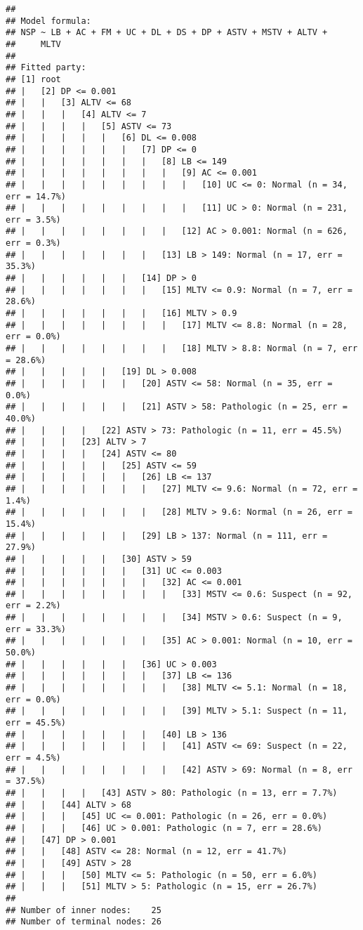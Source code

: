 \documentclass[
]{article}
\begin{document}
\begin{verbatim}
## 
## Model formula:
## NSP ~ LB + AC + FM + UC + DL + DS + DP + ASTV + MSTV + ALTV + 
##     MLTV
## 
## Fitted party:
## [1] root
## |   [2] DP <= 0.001
## |   |   [3] ALTV <= 68
## |   |   |   [4] ALTV <= 7
## |   |   |   |   [5] ASTV <= 73
## |   |   |   |   |   [6] DL <= 0.008
## |   |   |   |   |   |   [7] DP <= 0
## |   |   |   |   |   |   |   [8] LB <= 149
## |   |   |   |   |   |   |   |   [9] AC <= 0.001
## |   |   |   |   |   |   |   |   |   [10] UC <= 0: Normal (n = 34, err = 14.7%)
## |   |   |   |   |   |   |   |   |   [11] UC > 0: Normal (n = 231, err = 3.5%)
## |   |   |   |   |   |   |   |   [12] AC > 0.001: Normal (n = 626, err = 0.3%)
## |   |   |   |   |   |   |   [13] LB > 149: Normal (n = 17, err = 35.3%)
## |   |   |   |   |   |   [14] DP > 0
## |   |   |   |   |   |   |   [15] MLTV <= 0.9: Normal (n = 7, err = 28.6%)
## |   |   |   |   |   |   |   [16] MLTV > 0.9
## |   |   |   |   |   |   |   |   [17] MLTV <= 8.8: Normal (n = 28, err = 0.0%)
## |   |   |   |   |   |   |   |   [18] MLTV > 8.8: Normal (n = 7, err = 28.6%)
## |   |   |   |   |   [19] DL > 0.008
## |   |   |   |   |   |   [20] ASTV <= 58: Normal (n = 35, err = 0.0%)
## |   |   |   |   |   |   [21] ASTV > 58: Pathologic (n = 25, err = 40.0%)
## |   |   |   |   [22] ASTV > 73: Pathologic (n = 11, err = 45.5%)
## |   |   |   [23] ALTV > 7
## |   |   |   |   [24] ASTV <= 80
## |   |   |   |   |   [25] ASTV <= 59
## |   |   |   |   |   |   [26] LB <= 137
## |   |   |   |   |   |   |   [27] MLTV <= 9.6: Normal (n = 72, err = 1.4%)
## |   |   |   |   |   |   |   [28] MLTV > 9.6: Normal (n = 26, err = 15.4%)
## |   |   |   |   |   |   [29] LB > 137: Normal (n = 111, err = 27.9%)
## |   |   |   |   |   [30] ASTV > 59
## |   |   |   |   |   |   [31] UC <= 0.003
## |   |   |   |   |   |   |   [32] AC <= 0.001
## |   |   |   |   |   |   |   |   [33] MSTV <= 0.6: Suspect (n = 92, err = 2.2%)
## |   |   |   |   |   |   |   |   [34] MSTV > 0.6: Suspect (n = 9, err = 33.3%)
## |   |   |   |   |   |   |   [35] AC > 0.001: Normal (n = 10, err = 50.0%)
## |   |   |   |   |   |   [36] UC > 0.003
## |   |   |   |   |   |   |   [37] LB <= 136
## |   |   |   |   |   |   |   |   [38] MLTV <= 5.1: Normal (n = 18, err = 0.0%)
## |   |   |   |   |   |   |   |   [39] MLTV > 5.1: Suspect (n = 11, err = 45.5%)
## |   |   |   |   |   |   |   [40] LB > 136
## |   |   |   |   |   |   |   |   [41] ASTV <= 69: Suspect (n = 22, err = 4.5%)
## |   |   |   |   |   |   |   |   [42] ASTV > 69: Normal (n = 8, err = 37.5%)
## |   |   |   |   [43] ASTV > 80: Pathologic (n = 13, err = 7.7%)
## |   |   [44] ALTV > 68
## |   |   |   [45] UC <= 0.001: Pathologic (n = 26, err = 0.0%)
## |   |   |   [46] UC > 0.001: Pathologic (n = 7, err = 28.6%)
## |   [47] DP > 0.001
## |   |   [48] ASTV <= 28: Normal (n = 12, err = 41.7%)
## |   |   [49] ASTV > 28
## |   |   |   [50] MLTV <= 5: Pathologic (n = 50, err = 6.0%)
## |   |   |   [51] MLTV > 5: Pathologic (n = 15, err = 26.7%)
## 
## Number of inner nodes:    25
## Number of terminal nodes: 26
\end{verbatim}
\end{document}
